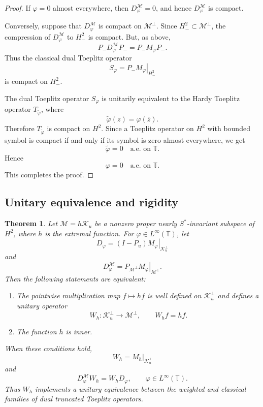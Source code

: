 \documentclass[10pt,a4paper]{amsart}
\newtheorem{theorem}{Theorem}[section]
\def \T{\mathbb{T}}
\newcommand{\clm}{\mathcal{M}}
\newcommand{\clk}{\mathcal{K}}
\newcommand{\vp}{\varphi}
\newcommand\restr[2]{\ensuremath{\left.#1\right|_{#2}}}
\numberwithin{equation}{section}
\begin{document}
\begin{proof}
If $\vp=0$ almost everywhere, then $D_\vp^\clm=0$, and hence
$D_\vp^\clm$ is compact.

Conversely, suppose that $D_\vp^\clm$ is compact on $\clm^\perp$. Since $H_{-}^2\subset\clm^\perp$, the compression of $D_\vp^\clm$ to $H_{-}^2$ is compact. But, as above,
\[
P_{-}D_\vp^\clm P_{-}
=
P_{-}M_\vp P_{-}.
\]
Thus the classical dual Toeplitz operator
\[
S_\vp=\restr{P_{-}M_\vp}{H_{-}^2}
\]
is compact on $H_{-}^2$.

The dual Toeplitz operator $S_\vp$ is unitarily equivalent to the Hardy
Toeplitz operator $T_{\widetilde{\vp}}$, where
\[
\widetilde{\vp}(z)=\vp(\bar{z}).
\]
Therefore $T_{\widetilde{\vp}}$ is compact on $H^2$. Since a Toeplitz operator on $H^2$ with bounded symbol is compact if and only if its symbol is zero almost everywhere, we get
\[
\widetilde{\vp}=0 \quad \text{a.e. on } \T.
\]
Hence
\[
\vp=0 \quad \text{a.e. on } \T.
\]
This completes the proof.
\end{proof}




\subsection{Unitary equivalence and rigidity}

\begin{theorem}\label{thm:rigidity}
Let $\clm=h\clk_u$ be a nonzero proper nearly $S^*$-invariant subspace
of $H^2$, where $h$ is the extremal function. For
$\vp\in L^\infty(\T)$, let
\[
D_\vp
=
\restr{(I-P_u)M_\vp}{\clk_u^\perp}
\]
and
\[
D_\vp^\clm
=
\restr{P_{\clm^\perp}M_\vp}{\clm^\perp}.
\]
Then the following statements are equivalent:
\begin{enumerate}
\item The pointwise multiplication map $f\mapsto hf$ is well defined on
$\clk_u^\perp$ and defines a unitary operator
\[
W_h:\clk_u^\perp\longrightarrow\clm^\perp,
\qquad
W_hf=hf.
\]
\item The function $h$ is inner.
\end{enumerate}
When these conditions hold,
\[
W_h=\restr{M_h}{\clk_u^\perp}
\]
and
\[
D_\vp^\clm W_h=W_hD_\vp,
\qquad
\vp\in L^\infty(\T).
\]
Thus $W_h$ implements a unitary equivalence between the weighted and
classical families of dual truncated Toeplitz operators.
\end{theorem}
\end{document}
